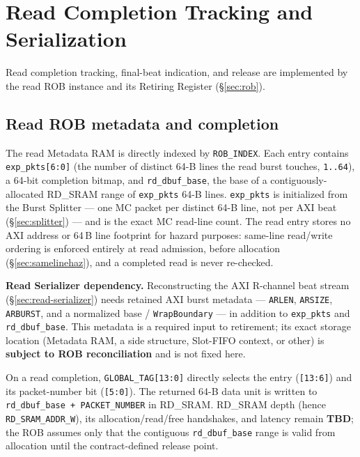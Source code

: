 \section{Read Completion Tracking and Serialization}
\label{sec:read-completion}

Read completion tracking, final-beat indication, and release are implemented
by the read ROB instance and its Retiring Register (\S\ref{sec:rob}).

\subsection{Read ROB metadata and completion}

The read Metadata RAM is directly indexed by \texttt{ROB\_INDEX}.  Each entry
contains \texttt{exp\_pkts[6:0]} (the number of distinct 64-B lines the read
burst touches, \texttt{1..64}), a 64-bit completion bitmap, and
\texttt{rd\_dbuf\_base}, the base of a contiguously-allocated RD\_SRAM range
of \texttt{exp\_pkts} 64-B lines.  \texttt{exp\_pkts} is initialized from the
Burst Splitter --- one MC packet per distinct 64-B line, not per AXI beat
(\S\ref{sec:splitter}) --- and is the exact MC read-line count.  The read
entry stores no AXI address or 64\,B line footprint for hazard purposes:
same-line read/write ordering is enforced entirely at read admission, before
allocation (\S\ref{sec:samelinehaz}), and a completed read is never
re-checked.

\textbf{Read Serializer dependency.}  Reconstructing the AXI R-channel beat
stream (\S\ref{sec:read-serializer}) needs retained AXI burst metadata ---
\texttt{ARLEN}, \texttt{ARSIZE}, \texttt{ARBURST}, and a normalized base /
\texttt{WrapBoundary} --- in addition to \texttt{exp\_pkts} and
\texttt{rd\_dbuf\_base}.  This metadata is a required input to retirement;
its exact storage location (Metadata RAM, a side structure, Slot-FIFO
context, or other) is \textbf{subject to ROB reconciliation} and is not
fixed here.

On a read completion, \texttt{GLOBAL\_TAG[13:0]} directly selects the entry
(\texttt{[13:6]}) and its packet-number bit (\texttt{[5:0]}).  The returned
64-B data unit is written to \texttt{rd\_dbuf\_base + PACKET\_NUMBER} in
RD\_SRAM.  RD\_SRAM depth (hence \texttt{RD\_SRAM\_ADDR\_W}), its
allocation/read/free handshakes, and latency remain \textbf{TBD}; the ROB
assumes only that the contiguous \texttt{rd\_dbuf\_base} range is valid from
allocation until the contract-defined release point.

